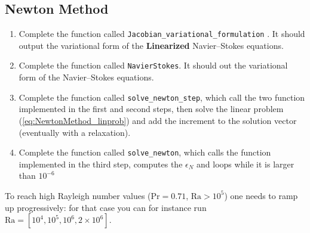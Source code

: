 \documentclass[12pt,a4paper]{scrartcl}
\def\Pran{\mbox{Pr}}  %
\def\Ra{\mbox{Ra}}    %
\begin{document}
\subsection{Newton Method}
\begin{enumerate}
\item Complete the function called \texttt{Jacobian\_variational\_formulation} \label{task_Jacobian}. It should output the variational form of the \textbf{Linearized }Navier--Stokes equations. 
\item Complete the function called \texttt{NavierStokes}. It should out the variational form of the Navier--Stokes equations.
\item Complete the function called \texttt{solve\_newton\_step}, which call the two function implemented in the first and second steps, then solve the linear problem (\ref{eq:NewtonMethod_linprob}) and add the increment to the solution vector (eventually with a relaxation).
\item Complete the function called \texttt{solve\_newton}, which calls the function implemented in the third step, computes the $\epsilon_N$ and loops while it is larger than $10^{-6}$
\end{enumerate}

To reach high Rayleigh number values ($\Pran=0.71$, $\Ra > 10^5$) one needs to ramp up progressively: for that case you can for instance run $\Ra =[10^4,10^5,10^6,2\times10^6]$. 
\end{document}
